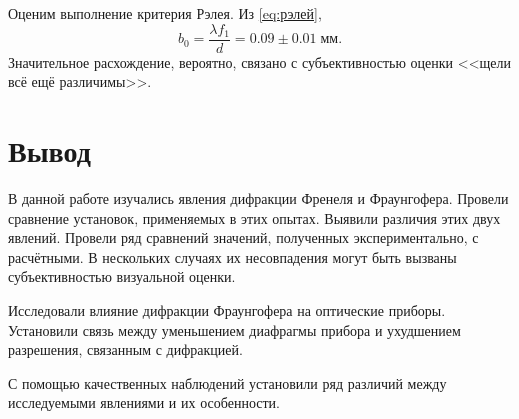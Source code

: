 \documentclass[a4paper, 12pt]{article}
\begin{document}
Оценим выполнение критерия Рэлея. Из \eqref{eq:рэлей},
\begin{equation}\label{eq:last}
	b_0 = \frac{\lambda f_1}{d} = 0.09\pm 0.01\; мм.
\end{equation}
Значительное расхождение, вероятно, связано с субъективностью оценки <<щели всё ещё различимы>>. 

\section{Вывод}

В данной работе изучались явления дифракции Френеля и Фраунгофера. Провели сравнение установок, применяемых в этих опытах. Выявили различия этих двух явлений. Провели ряд сравнений значений, полученных экспериментально, с расчётными. В нескольких случаях их несовпадения могут быть вызваны субъективностью визуальной оценки.

Исследовали влияние дифракции Фраунгофера на оптические приборы. Установили связь между уменьшением диафрагмы прибора и ухудшением разрешения, связанным с дифракцией.

С помощью качественных наблюдений установили ряд различий между исследуемыми явлениями и их особенности.
\end{document}
